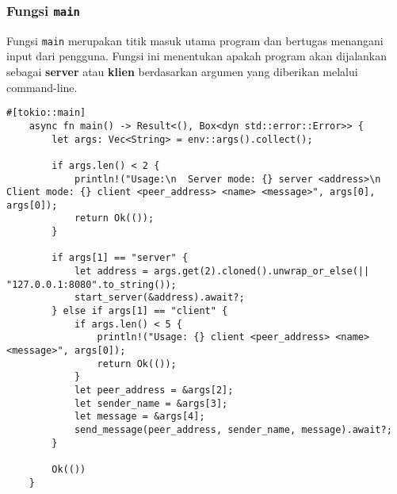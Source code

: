 \subsubsection{Fungsi \texttt{main}}

Fungsi \texttt{main} merupakan titik masuk utama program dan bertugas menangani input dari pengguna. Fungsi ini menentukan apakah program akan dijalankan sebagai \textbf{server} atau \textbf{klien} berdasarkan argumen yang diberikan melalui command-line.

\begin{lstlisting}[style=RustStyle]
	#[tokio::main]
	async fn main() -> Result<(), Box<dyn std::error::Error>> {
		let args: Vec<String> = env::args().collect();
		
		if args.len() < 2 {
			println!("Usage:\n  Server mode: {} server <address>\n  Client mode: {} client <peer_address> <name> <message>", args[0], args[0]);
			return Ok(());
		}
		
		if args[1] == "server" {
			let address = args.get(2).cloned().unwrap_or_else(|| "127.0.0.1:8080".to_string());
			start_server(&address).await?;
		} else if args[1] == "client" {
			if args.len() < 5 {
				println!("Usage: {} client <peer_address> <name> <message>", args[0]);
				return Ok(());
			}
			let peer_address = &args[2];
			let sender_name = &args[3];
			let message = &args[4];
			send_message(peer_address, sender_name, message).await?;
		}
		
		Ok(())
	}
\end{lstlisting}


